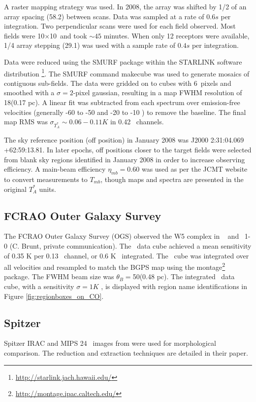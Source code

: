 A raster mapping strategy was used.  In 2008, the array was shifted by 1/2 of
an array spacing (58.2\arcsec) between scans.  Data was sampled at a rate of
$0.6 s$ per integration.  Two perpendicular scans were used for each field
observed.  Most fields were 10$\times$10\arcmin\ and took $\sim45$ minutes.
When only 12 receptors were available, 1/4 array stepping (29.1\arcsec) was
used with a sample rate of $0.4 s$ per integration.

Data were reduced using the SMURF package within the STARLINK software distribution
\footnote{\url{http://starlink.jach.hawaii.edu/}}.  The SMURF command {\sc makecube} was used to
generate mosaics of contiguous sub-fields.  The data were gridded on to cubes
with 6\arcsec\ pixels and smoothed with a $\sigma=2$-pixel gaussian, resulting
in a map FWHM resolution of 18\arcsec (0.17 pc).  A linear fit was subtracted from each
spectrum over emission-free velocities (generally -60 to -50 and -20 to -10
\kms) to remove the baseline.  The final map RMS was $\sigma_{T_A^*}\sim
0.06-0.11 K$ in 0.42 \kms\ channels.

The sky reference position (off position) in January 2008 was J2000 2:31:04.069 +62:59:13.81.
In later epochs, off positions closer to the target fields were selected from blank sky regions
identified in January 2008 in order to increase observing efficiency.  A
main-beam efficiency $\eta_{mb}=0.60$ was used as per the JCMT website to
convert measurements to $T_{mb}$, though maps and spectra are presented in the
original $T_A^*$ units.

\subsection{FCRAO Outer Galaxy Survey}
The FCRAO Outer Galaxy Survey (OGS)
observed the W5 complex in \twelveco\  \citep{heyer:ogs:1998} and \thirteenco\
1-0 (C. Brunt, private communication).  The \thirteenco\ data cube achieved a
mean sensitivity of 0.35 K per 0.13 \kms\ channel, or 0.6 K \kms\ integrated.
The \thirteenco\ cube was integrated over all velocities and resampled to match
the BGPS map using the {\sc montage}\footnote{\url{http://montage.ipac.caltech.edu/}}
package.  The FWHM beam size was  $\theta_{B}=$50\farcs (0.48 pc).  The integrated
\twelveco\ data cube, with a sensitivity $\sigma= 1 K$ \kms, is displayed with 
region name identifications in Figure \ref{fig:regionboxes_on_CO}.

\subsection{Spitzer}
Spitzer IRAC and MIPS 24 \um\ images from \citet{koenig:clustered:2008} were
used for morphological comparison.  The reduction and extraction techniques are
detailed in their paper.

